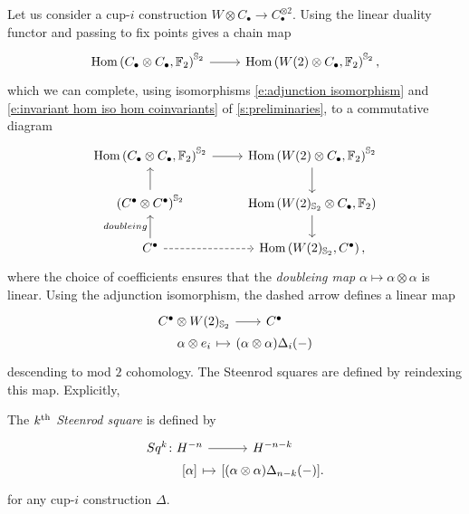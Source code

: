 Let us consider a cup-$i$ construction $W \otimes C_\bullet \to C_\bullet^{\otimes 2}$.
Using the linear duality functor and passing to fix points gives a chain map
\begin{equation*}
\begin{tikzcd}
\Hom\left(C_\bullet \otimes C_\bullet, \Ftwo \right)^{\Sym_2} \arrow[r] &
\Hom\left(W(2) \otimes C_\bullet, \Ftwo \right)^{\Sym_2},
\end{tikzcd}
\end{equation*}
which we can complete, using isomorphisms \eqref{e:adjunction isomorphism} and \eqref{e:invariant hom iso hom coinvariants} of \cref{s:preliminaries}, to a commutative diagram
\begin{equation*}
\begin{tikzcd}
\Hom\left(C_\bullet \otimes C_\bullet, \Ftwo \right)^{\Sym_2} \arrow[r] &
\Hom\left(W(2) \otimes C_\bullet, \Ftwo \right)^{\Sym_2} \arrow[d] \\
\left(C^\bullet \otimes C^\bullet\right)^{\Sym_2} \arrow[u]&
\Hom\left(W(2)_{\Sym_2} \otimes C_\bullet, \Ftwo \right) \arrow[d] \\
C^\bullet \arrow[u, "doubleing"] \arrow[r, dashed]&
\Hom\left(W(2)_{\Sym_2}, C^\bullet\right),
\end{tikzcd}
\end{equation*}
where the choice of coefficients ensures that the \textit{doubleing map} $\alpha \mapsto \alpha \otimes \alpha$ is linear.
Using the adjunction isomorphism, the dashed arrow defines a linear map
\begin{equation} \label{e:Steenrod squares parameterized}
\begin{tikzcd}[row sep=0pt, column sep = tiny]
C^\bullet \otimes W(2)_{\Sym_2} \arrow[r] &[-10pt] C^\bullet \\
\alpha \otimes e_i \arrow[r, |->] & (\alpha \otimes \alpha)\Delta_i(-)
\end{tikzcd}
\end{equation}
descending to mod $2$ cohomology.
The Steenrod squares are defined by reindexing this map.
Explicitly,
\begin{definition} \label{d:steenrod squares}
	The \textit{$k^{\mathrm{th}}$ Steenrod square} is defined by
	\begin{equation} \label{e:steenrod squares}
	\begin{tikzcd}[row sep=0pt, column sep=tiny]
	Sq^k \colon H^{-n} \arrow[r] & H^{-n-k} \\
	\phantom{Sq^k \colon}{[\alpha]} \arrow[r, |->] & {\left[(\alpha \otimes \alpha)\Delta_{n-k}(-) \right]}.
	\end{tikzcd}
	\end{equation}
	for any cup-$i$ construction $\Delta$.
\end{definition}

